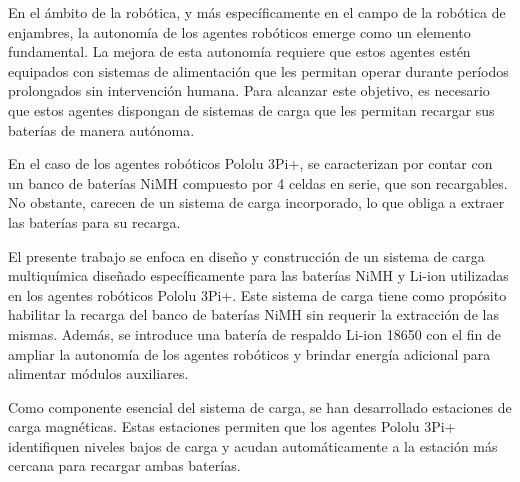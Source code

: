 
En el ámbito de la robótica, y más específicamente en el campo de
 la robótica de enjambres, la autonomía de los agentes robóticos emerge como
un elemento fundamental. La mejora de esta autonomía requiere que estos agentes
estén equipados con sistemas de alimentación que les permitan operar durante 
períodos prolongados sin intervención humana. Para alcanzar este objetivo, es 
necesario que estos agentes dispongan de sistemas de carga que les permitan 
recargar sus baterías de manera autónoma.

En el caso de los agentes robóticos Pololu 3Pi+, se caracterizan por contar
con un banco de baterías NiMH compuesto por 4 celdas en serie, que son 
recargables. No obstante, carecen de un sistema de carga incorporado, lo 
que obliga a extraer las baterías para su recarga.

El presente trabajo se enfoca en diseño y construcción de un sistema 
de carga multiquímica diseñado específicamente para las baterías NiMH y 
Li-ion utilizadas en los agentes robóticos Pololu 3Pi+. Este sistema de carga 
tiene como propósito habilitar la recarga del banco de baterías NiMH sin 
requerir la extracción de las mismas. Además, se introduce una batería de 
respaldo Li-ion 18650 con el fin de ampliar la autonomía de los agentes 
robóticos y brindar energía adicional para alimentar módulos auxiliares.

Como componente esencial del sistema de carga, se han desarrollado estaciones
de carga magnéticas. Estas estaciones permiten que los agentes Pololu 3Pi+ 
identifiquen niveles bajos de carga y acudan automáticamente a la estación más cercana para recargar ambas baterías.
